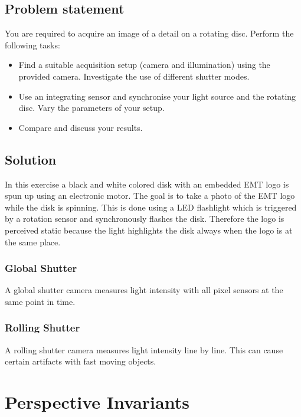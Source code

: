 \documentclass[
a4paper,     %
12pt         %
]{scrartcl}  %
\begin{document}
\subsection{Problem statement}

You are required to acquire an image of a detail on a rotating disc. Perform the following tasks:

\begin{itemize}
 \item Find a suitable acquisition setup (camera and illumination) using the provided camera. Investigate the use of different shutter modes.
 \item Use an integrating sensor and synchronise your light source and the rotating disc. Vary the parameters of your setup.
 \item Compare and discuss your results.
\end{itemize}

\subsection{Solution}

In this exercise a black and white colored disk with an embedded EMT logo is spun up using an electronic motor.
The goal is to take a photo of the EMT logo while the disk is spinning.
This is done using a LED flashlight which is triggered by a rotation sensor and synchronously flashes the disk.
Therefore the logo is perceived static because the light highlights the disk always when the logo is at the same place.

\subsubsection{Global Shutter}

A global shutter camera measures light intensity with all pixel sensors at the same point in time.

\subsubsection{Rolling Shutter}

A rolling shutter camera measures light intensity line by line.
This can cause certain artifacts with fast moving objects.

\pagebreak
\section{Perspective Invariants}
\end{document}
